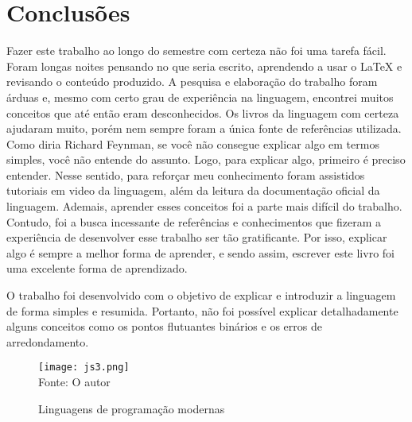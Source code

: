 

\chapter{Conclus\~{o}es}


Fazer este trabalho ao longo do semestre com certeza não foi uma tarefa fácil. Foram longas noites pensando no que seria escrito, aprendendo a usar o LaTeX e revisando o conteúdo produzido. A pesquisa e elaboração do trabalho foram árduas e, mesmo com certo grau de experiência na linguagem, encontrei muitos conceitos que até então eram desconhecidos. 
Os livros da linguagem com certeza ajudaram muito, porém nem sempre foram a única fonte de referências utilizada. Como diria Richard Feynman, se você não consegue explicar algo em termos simples, você não entende do assunto. Logo, para explicar algo, primeiro é preciso entender. Nesse sentido, para reforçar meu conhecimento foram assistidos tutoriais em video da linguagem, além da leitura da documentação oficial da linguagem.
Ademais, aprender esses conceitos foi a parte mais difícil do trabalho.
Contudo, foi a busca incessante de referências e conhecimentos que fizeram a experiência de desenvolver esse trabalho ser tão gratificante. Por isso, explicar algo é sempre a melhor forma de aprender, e sendo assim, escrever este livro foi uma excelente forma de aprendizado.  
  
  O trabalho foi desenvolvido com o objetivo de explicar e introduzir a linguagem de forma simples e resumida. Portanto, não foi possível explicar detalhadamente alguns conceitos como os pontos flutuantes binários e os erros de arredondamento. 



   \begin{figure}[H]
    \begin{center}
        \caption{Linguagens de programa\c{c}\~{a}o modernas} \label{ling2}
        \texttt{[image: js3.png]} \\
        {\tiny \sf Fonte: O autor }
    \end{center}
   \end{figure} 
